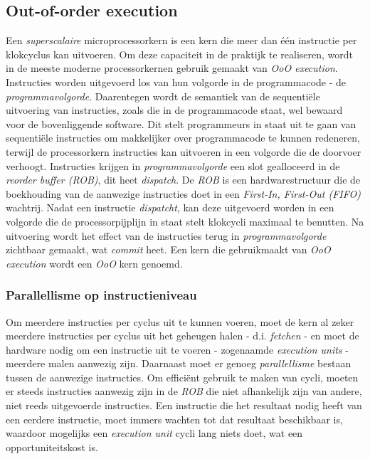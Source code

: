 \documentclass[12pt,a4paper,faculty=ea,language=nl]{ugent-doc}
\begin{document}
\subsection{Out-of-order execution}
Een \textit{superscalaire} microprocessorkern is een kern die meer dan één instructie per klokcyclus kan uitvoeren. Om deze capaciteit in de praktijk te realiseren, wordt in de meeste moderne processorkernen gebruik gemaakt van \textit{OoO execution}. Instructies worden uitgevoerd los van hun volgorde in de programmacode - de \textit{programmavolgorde}. Daarentegen wordt de semantiek van de sequentiële uitvoering van instructies, zoals die in de programmacode staat, wel bewaard voor de bovenliggende software. Dit stelt programmeurs in staat uit te gaan van sequentiële instructies om makkelijker over programmacode te kunnen redeneren, terwijl de processorkern instructies kan uitvoeren in een volgorde die de doorvoer verhoogt. Instructies krijgen in  \textit{programmavolgorde} een slot gealloceerd in de \textit{reorder buffer (ROB)}, dit heet \textit{dispatch}. De \textit{ROB} is een hardwarestructuur die de boekhouding van de aanwezige instructies doet in een \textit{First-In, First-Out (FIFO)} wachtrij. Nadat een instructie \textit{dispatcht}, kan deze uitgevoerd worden in een volgorde die de processorpijplijn in staat stelt klokcycli maximaal te benutten. Na uitvoering wordt het effect van de instructies terug in \textit{programmavolgorde} zichtbaar gemaakt, wat \textit{commit} heet. Een kern die gebruikmaakt van \textit{OoO execution} wordt een \textit{OoO} kern genoemd.


\subsubsection{Parallellisme op instructieniveau}
Om meerdere instructies per cyclus uit te kunnen voeren, moet de kern al zeker meerdere instructies per cyclus uit het geheugen halen - d.i. \textit{fetchen} - en moet de hardware nodig om een instructie uit te voeren - zogenaamde \textit{execution units} - meerdere malen aanwezig zijn. Daarnaast moet er genoeg \textit{parallellisme} bestaan tussen de aanwezige instructies. Om efficiënt gebruik te maken van cycli, moeten er steeds instructies aanwezig zijn in de \textit{ROB} die niet afhankelijk zijn van andere, niet reeds uitgevoerde instructies. Een instructie die het resultaat nodig heeft van een eerdere instructie, moet immers wachten tot dat resultaat beschikbaar is, waardoor mogelijks een \textit{execution unit} cycli lang niets doet, wat een opportuniteitskost is.
\end{document}
